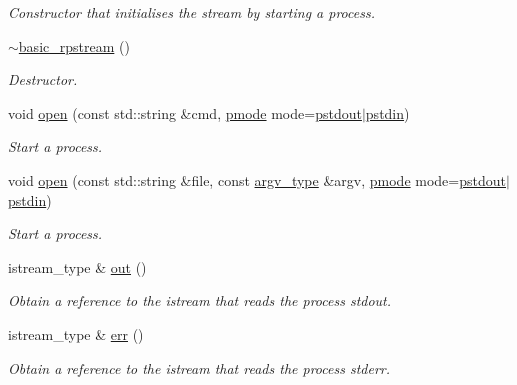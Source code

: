 \begin{DoxyCompactItemize}
\begin{DoxyCompactList}\small\item\em Constructor that initialises the stream by starting a process. \end{DoxyCompactList}\item 
\mbox{\label{classredi_1_1basic__rpstream_a10110031b05c0a812d1be59da6dacc8d}} 
\mbox{\hyperlink{classredi_1_1basic__rpstream_a10110031b05c0a812d1be59da6dacc8d}{$\sim$basic\+\_\+rpstream}} ()
\begin{DoxyCompactList}\small\item\em Destructor. \end{DoxyCompactList}\item 
void \mbox{\hyperlink{classredi_1_1basic__rpstream_a6f9d538dbcf3201f7be7638f5f389816}{open}} (const std\+::string \&cmd, \mbox{\hyperlink{structredi_1_1pstreams_a1eae4aad88812af03a0fbb3ec13c50b7}{pmode}} mode=\mbox{\hyperlink{structredi_1_1pstreams_ad3c6d53a98de4566478b1c40c101a42b}{pstdout}}$\vert$\mbox{\hyperlink{structredi_1_1pstreams_a7a976ce992db857f86a0cc3352e42d3a}{pstdin}})
\begin{DoxyCompactList}\small\item\em Start a process. \end{DoxyCompactList}\item 
void \mbox{\hyperlink{classredi_1_1basic__rpstream_a4423510e97fc8216f80f020c5411c09d}{open}} (const std\+::string \&file, const \mbox{\hyperlink{structredi_1_1pstreams_af902b894b095c1875e96c10129489467}{argv\+\_\+type}} \&argv, \mbox{\hyperlink{structredi_1_1pstreams_a1eae4aad88812af03a0fbb3ec13c50b7}{pmode}} mode=\mbox{\hyperlink{structredi_1_1pstreams_ad3c6d53a98de4566478b1c40c101a42b}{pstdout}}$\vert$\mbox{\hyperlink{structredi_1_1pstreams_a7a976ce992db857f86a0cc3352e42d3a}{pstdin}})
\begin{DoxyCompactList}\small\item\em Start a process. \end{DoxyCompactList}\item 
istream\+\_\+type \& \mbox{\hyperlink{classredi_1_1basic__rpstream_aa1de7000f183ef98a1be7b9c0e7a8590}{out}} ()
\begin{DoxyCompactList}\small\item\em Obtain a reference to the istream that reads the process\textquotesingle{} {\ttfamily stdout}. \end{DoxyCompactList}\item 
istream\+\_\+type \& \mbox{\hyperlink{classredi_1_1basic__rpstream_a3170d8e6c74d8280d89918bb3334f324}{err}} ()
\begin{DoxyCompactList}\small\item\em Obtain a reference to the istream that reads the process\textquotesingle{} {\ttfamily stderr}. \end{DoxyCompactList}\end{DoxyCompactItemize}
